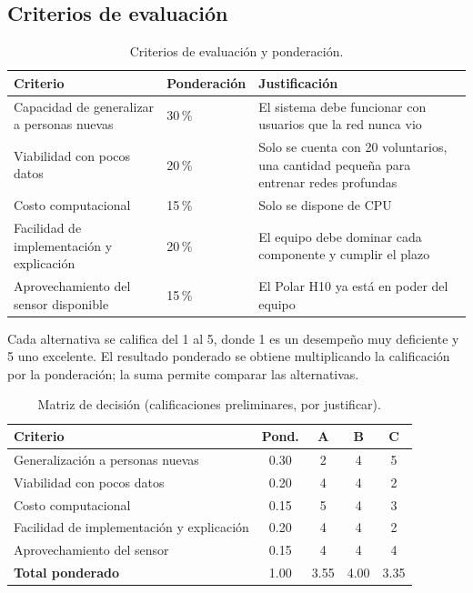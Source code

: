 \subsection{Criterios de evaluación}

\begin{table}[htbp]
\centering
\caption{Criterios de evaluación y ponderación.}
\label{tab:criterios}
\small
\begin{tabularx}{\textwidth}{l l X}
\toprule
\textbf{Criterio} & \textbf{Ponderación} & \textbf{Justificación} \\
\midrule
Capacidad de generalizar a personas nuevas & 30\,\% & El sistema debe funcionar con usuarios que la red nunca vio \\
Viabilidad con pocos datos & 20\,\% & Solo se cuenta con 20 voluntarios, una cantidad pequeña para entrenar redes profundas \\
Costo computacional & 15\,\% & Solo se dispone de CPU \\
Facilidad de implementación y explicación & 20\,\% & El equipo debe dominar cada componente y cumplir el plazo \\
Aprovechamiento del sensor disponible & 15\,\% & El Polar H10 ya está en poder del equipo \\
\bottomrule
\end{tabularx}
\end{table}

Cada alternativa se califica del 1 al 5, donde 1 es un desempeño muy deficiente y 5 uno excelente. El resultado ponderado se obtiene multiplicando la calificación por la ponderación; la suma permite comparar las alternativas.

\begin{table}[htbp]
\centering
\caption{Matriz de decisión (calificaciones preliminares, por justificar).}
\label{tab:decision}
\small
\begin{tabular}{l c c c c}
\toprule
\textbf{Criterio} & \textbf{Pond.} & \textbf{A} & \textbf{B} & \textbf{C} \\
\midrule
Generalización a personas nuevas & 0.30 & 2 & 4 & 5 \\
Viabilidad con pocos datos & 0.20 & 4 & 4 & 2 \\
Costo computacional & 0.15 & 5 & 4 & 3 \\
Facilidad de implementación y explicación & 0.20 & 4 & 4 & 2 \\
Aprovechamiento del sensor & 0.15 & 4 & 4 & 4 \\
\midrule
\textbf{Total ponderado} & 1.00 & 3.55 & 4.00 & 3.35 \\
\bottomrule
\end{tabular}
\end{table}

